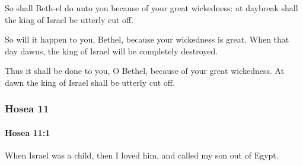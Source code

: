 			\begin{versebox}
					\item[BHS] 
					\item[LXX] 
					\item[ASV] So shall Beth-el do unto you because of your great wickedness: at daybreak shall the king of Israel be utterly cut off.
					\item[NIV] So will it happen to you, Bethel, because your wickedness is great. When that day dawns, the king of Israel will be completely destroyed.
					\item[NRSV] Thus it shall be done to you, O Bethel, because of your great wickedness. At dawn the king of Israel shall be utterly cut off.
			\end{versebox}
	\subsubsection{Hosea 11} %
		\label{HOSEA-11}

		\paragraph{Hosea 11:1} %
			\label{HOSEA-11-1}

			When Israel was a child, then I loved him, and called my son out of Egypt.

